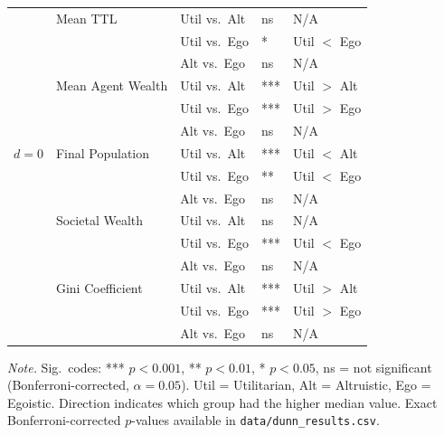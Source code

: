 \documentclass{icsthesis}
\begin{document}
\begin{mainmatter}
\begin{table}[H]
\begin{tabular}{
			>{\raggedright\arraybackslash}p{1.8cm}
			>{\raggedright\arraybackslash}p{3.2cm}
			>{\raggedright\arraybackslash}p{2.8cm}
			l l
		}
		         & Mean TTL            & Util vs.\ Alt & ns  & N/A          \\
		         &                     & Util vs.\ Ego & *   & Util $<$ Ego \\
		         &                     & Alt vs.\ Ego  & ns  & N/A          \\
		         & Mean Agent Wealth   & Util vs.\ Alt & *** & Util $>$ Alt \\
		         &                     & Util vs.\ Ego & *** & Util $>$ Ego \\
		         &                     & Alt vs.\ Ego  & ns  & N/A          \\
		\hline
		$d = 0$  & Final Population    & Util vs.\ Alt & *** & Util $<$ Alt \\
		         &                     & Util vs.\ Ego & **  & Util $<$ Ego \\
		         &                     & Alt vs.\ Ego  & ns  & N/A          \\
		         & Societal Wealth     & Util vs.\ Alt & ns  & N/A          \\
		         &                     & Util vs.\ Ego & *** & Util $<$ Ego \\
		         &                     & Alt vs.\ Ego  & ns  & N/A          \\
		         & Gini Coefficient    & Util vs.\ Alt & *** & Util $>$ Alt \\
		         &                     & Util vs.\ Ego & *** & Util $>$ Ego \\
		         &                     & Alt vs.\ Ego  & ns  & N/A          \\
		\hline
		\end{tabular}
		\par\smallskip
		{\footnotesize\noindent\textit{Note.} Sig.\ codes: *** $p < 0.001$, ** $p < 0.01$, * $p < 0.05$, ns = not significant (Bonferroni-corrected, $\alpha = 0.05$). Util = Utilitarian, Alt = Altruistic, Ego = Egoistic. Direction indicates which group had the higher median value. Exact Bonferroni-corrected $p$-values available in \texttt{data/dunn\_results.csv}.}
		\end{table}

			
	\end{mainmatter}
\end{document}
